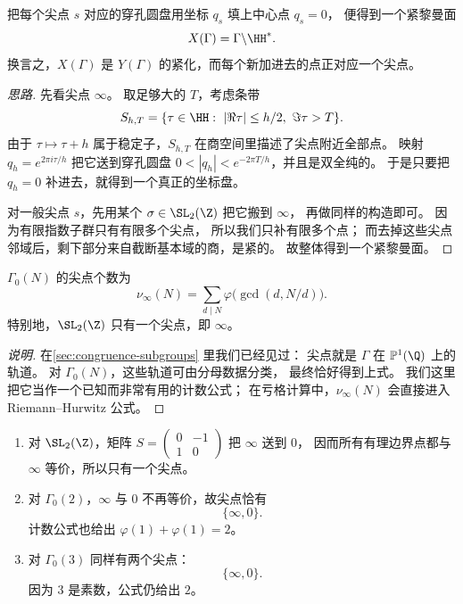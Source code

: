 

\begin{theorem}
\label{thm:x-gamma-compact-riemann}
把每个尖点 $s$ 对应的穿孔圆盘用坐标 $q_s$ 填上中心点 $q_s=0$，
便得到一个紧黎曼面
\[
  X(\Gamma)=\Gamma\backslash\HH^*.
\]
换言之，$X(\Gamma)$ 是 $Y(\Gamma)$ 的紧化，而每个新加进去的点正对应一个尖点。
\end{theorem}

\begin{proof}[思路]
先看尖点 $\infty$。
取足够大的 $T$，考虑条带
\[
  S_{h,T}=\{\tau\in\HH:\ |\Re\tau|\le h/2,\ \Im\tau>T\}.
\]
由于 $\tau\mapsto\tau+h$ 属于稳定子，$S_{h,T}$ 在商空间里描述了尖点附近全部点。
映射 $q_h=e^{2\pi i\tau/h}$ 把它送到穿孔圆盘
$0<|q_h|<e^{-2\pi T/h}$，并且是双全纯的。
于是只要把 $q_h=0$ 补进去，就得到一个真正的坐标盘。

对一般尖点 $s$，先用某个 $\sigma\in\SL_2(\Z)$ 把它搬到 $\infty$，
再做同样的构造即可。
因为有限指数子群只有有限多个尖点，
所以我们只补有限多个点；
而去掉这些尖点邻域后，剩下部分来自截断基本域的商，是紧的。
故整体得到一个紧黎曼面。
\end{proof}

\begin{proposition}
\label{prop:number-of-cusps-gamma0N}
$\Gamma_0(N)$ 的尖点个数为
\[
  \nu_\infty(N)=\sum_{d\mid N}\varphi\bigl(\gcd(d,N/d)\bigr).
\]
特别地，$\SL_2(\Z)$ 只有一个尖点，即 $\infty$。
\end{proposition}

\begin{proof}[说明]
在\cref{sec:congruence-subgroups} 里我们已经见过：
尖点就是 $\Gamma$ 在 $\mathbb{P}^1(\Q)$ 上的轨道。
对 $\Gamma_0(N)$，这些轨道可由分母数据分类，
最终恰好得到上式。
我们这里把它当作一个已知而非常有用的计数公式；
在亏格计算中，$\nu_\infty(N)$ 会直接进入 Riemann--Hurwitz 公式。
\end{proof}

\begin{example}[$X(1)$、$X_0(2)$ 与 $X_0(3)$ 的尖点]
\label{ex:cusps-small-levels}
\begin{enumerate}
  \item 对 $\SL_2(\Z)$，矩阵
    $S=\begin{pmatrix}0&-1\\1&0\end{pmatrix}$ 把 $\infty$ 送到 $0$，
    因而所有有理边界点都与 $\infty$ 等价，所以只有一个尖点。
  \item 对 $\Gamma_0(2)$，$\infty$ 与 $0$ 不再等价，故尖点恰有
    \[
      \{\infty,0\}.
    \]
    计数公式也给出
    $\varphi(1)+\varphi(1)=2$。
  \item 对 $\Gamma_0(3)$ 同样有两个尖点：
    \[
      \{\infty,0\}.
    \]
    因为 $3$ 是素数，公式仍给出 $2$。
\end{enumerate}
\end{example}

